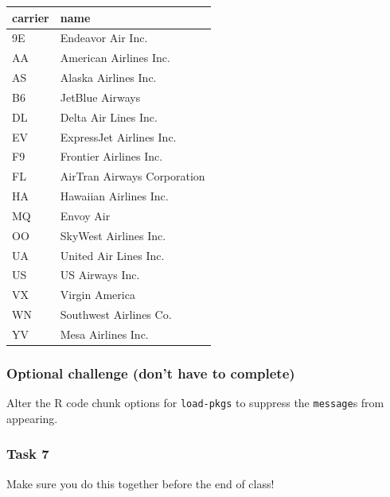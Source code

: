 \documentclass[
  letterpaper,
  DIV=11,
  numbers=noendperiod]{scrreprt}
\begin{document}
\begin{longtable}[]{@{}ll@{}}
\toprule()
carrier & name \\
\midrule()
\endhead
9E & Endeavor Air Inc. \\
AA & American Airlines Inc. \\
AS & Alaska Airlines Inc. \\
B6 & JetBlue Airways \\
DL & Delta Air Lines Inc. \\
EV & ExpressJet Airlines Inc. \\
F9 & Frontier Airlines Inc. \\
FL & AirTran Airways Corporation \\
HA & Hawaiian Airlines Inc. \\
MQ & Envoy Air \\
OO & SkyWest Airlines Inc. \\
UA & United Air Lines Inc. \\
US & US Airways Inc. \\
VX & Virgin America \\
WN & Southwest Airlines Co. \\
YV & Mesa Airlines Inc. \\
\bottomrule()
\end{longtable}

\hypertarget{optional-challenge-dont-have-to-complete}{%
\subsubsection*{Optional challenge (don't have to
complete)}\label{optional-challenge-dont-have-to-complete}}

Alter the R code chunk options for \texttt{load-pkgs} to suppress the
\texttt{message}s from appearing.

\hypertarget{task-7}{%
\subsubsection*{Task 7}\label{task-7}}

\begin{tcolorbox}[enhanced jigsaw, colframe=quarto-callout-important-color-frame, breakable, colback=white, toprule=.15mm, leftrule=.75mm, title={Teaching note:}, left=2mm, coltitle=black, bottomtitle=1mm, bottomrule=.15mm, rightrule=.15mm, colbacktitle=quarto-callout-important-color!10!white, opacitybacktitle=0.6, opacityback=0, toptitle=1mm, arc=.35mm, titlerule=0mm]
Make sure you do this together before the end of class!
\end{tcolorbox}
\end{document}
